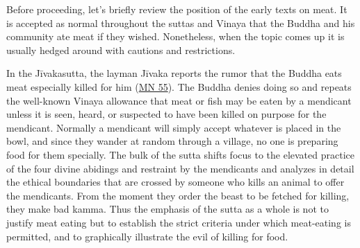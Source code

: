 \documentclass[12pt,openany]{book}%
\begin{document}
Before proceeding, let’s briefly review the position of the early texts on meat. It is accepted as normal throughout the suttas and Vinaya that the Buddha and his community ate meat if they wished. Nonetheless, when the topic comes up it is usually hedged around with cautions and restrictions.

In the \textsanskrit{Jīvakasutta}, the layman \textsanskrit{Jīvaka} reports the rumor that the Buddha eats meat especially killed for him (\href{https://suttacentral.net/mn55/en/sujato}{MN 55}). The Buddha denies doing so and repeats the well-known Vinaya allowance that meat or fish may be eaten by a mendicant unless it is seen, heard, or suspected to have been killed on purpose for the mendicant. Normally a mendicant will simply accept whatever is placed in the bowl, and since they wander at random through a village, no one is preparing food for them specially. The bulk of the sutta shifts focus to the elevated practice of the four divine abidings and restraint by the mendicants and analyzes in detail the ethical boundaries that are crossed by someone who kills an animal to offer the mendicants. From the moment they order the beast to be fetched for killing, they make bad kamma. Thus the emphasis of the sutta as a whole is not to justify meat eating but to establish the strict criteria under which meat-eating is permitted, and to graphically illustrate the evil of killing for food.
\end{document}
